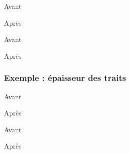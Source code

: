 \begin{code}
\begin{fast}{Avant}
\end{fast}

\renewcommand*{\fastDecalageTrait}{-13pt}	%
\begin{fast}{Après}
\end{fast}
\fastReset
\end{code}
\cqd
\begin{exemple}
\begin{fast}{Avant}
\end{fast}
\renewcommand*{\fastDecalageTrait}{-13pt}
\begin{fast}{Après}
\end{fast}
\fastReset
\end{exemple}







	\subsubsection{Exemple : épaisseur des traits}\label{epaisseur}


\begin{code}
\begin{fast}{Avant}
\end{fast}

\renewcommand*{\fastEpaisseurTraits}{2pt}	%
\begin{fast}{Après}
\end{fast}
\fastReset
\end{code}
\cqd
\begin{exemple}
\begin{fast}{Avant}
\end{fast}
\renewcommand*{\fastEpaisseurTraits}{2pt}
\begin{fast}{Après}
\end{fast}
\fastReset
\end{exemple}




